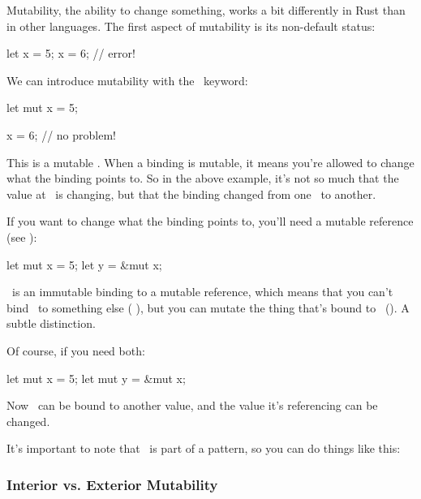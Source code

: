 Mutability, the ability to change something, works a bit differently in Rust than in other languages. The first aspect of 
mutability is its non-default status:

\begin{rustc}
let x = 5;
x = 6; // error!
\end{rustc}

We can introduce mutability with the \mut\ keyword:

\begin{rustc}
let mut x = 5;

x = 6; // no problem!
\end{rustc}

This is a mutable . When a binding is mutable, it means you're allowed to change what the 
binding points to. So in the above example, it's not so much that the value at \x\ is changing, but that the binding changed
from one \itt\ to another.

\blank

If you want to change what the binding points to, you'll need a mutable reference (see ):

\begin{rustc}
let mut x = 5;
let y = &mut x;
\end{rustc}

\y\ is an immutable binding to a mutable reference, which means that you can't bind \y\ to something else (
), but you can mutate the thing that's bound to \y\ (). A subtle distinction.

\blank

Of course, if you need both:

\begin{rustc}
let mut x = 5;
let mut y = &mut x;
\end{rustc}

Now \y\ can be bound to another value, and the value it's referencing can be changed.

\blank

It's important to note that \mut\ is part of a pattern, so you can do things like this:

\begin{rustc}
let (mut x, y) = (5, 6);

fn foo(mut x: i32) {
\end{rustc}

\subsubsection*{Interior vs. Exterior Mutability}

